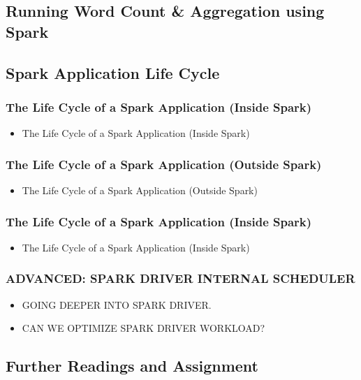 \subsection{Running Word Count \& Aggregation using Spark}\label{subsec:running-word-count-&-aggregation-using-spark}



\subsection{Spark Application Life Cycle}\label{subsec:spark-application-life-cycle}
\begin{frame}
    \frametitle{The Life Cycle of a Spark Application (Inside Spark)}
    \begin{itemize}
        \item The Life Cycle of a Spark Application (Inside Spark)
    \end{itemize}
\end{frame}
\begin{frame}
    \frametitle{The Life Cycle of a Spark Application (Outside Spark)}
    \begin{itemize}
        \item The Life Cycle of a Spark Application (Outside Spark)
    \end{itemize}
\end{frame}
\begin{frame}
    \frametitle{The Life Cycle of a Spark Application (Inside Spark)}
    \begin{itemize}
        \item The Life Cycle of a Spark Application (Inside Spark)
    \end{itemize}
\end{frame}

\begin{frame}
    \frametitle{ADVANCED: SPARK DRIVER INTERNAL SCHEDULER}
    \begin{itemize}
        \item GOING DEEPER INTO SPARK DRIVER.
        \item CAN WE OPTIMIZE SPARK DRIVER WORKLOAD?
    \end{itemize}
\end{frame}

\subsection{Further Readings and Assignment}




